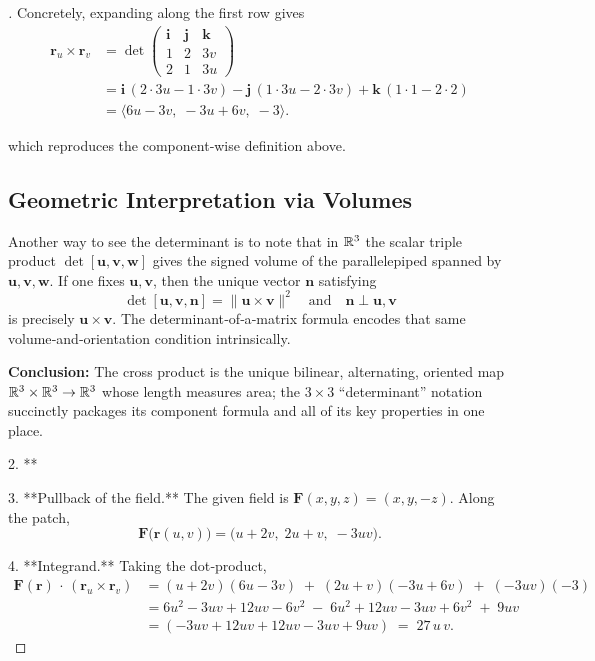 \documentclass[11pt,openany]{article}
\renewcommand{\emph}[1]{\textbf{#1}}
\begin{document}
\begin{proof}[\sol]
Concretely, expanding along the first row gives
\begin{align*}
	\mathbf r_u \times \mathbf r_v
	&=
	\det
	\begin{pmatrix}
		\mathbf i & \mathbf j & \mathbf k\\
		1         & 2         & 3v\\
		2         & 1         & 3u
	\end{pmatrix}\\
	&=
	\mathbf i\,(2\cdot3u - 1\cdot3v)
	-
	\mathbf j\,(1\cdot3u - 2\cdot3v)
	+
	\mathbf k\,(1\cdot1   - 2\cdot2)\\
	&=
	\bigl\langle 6u - 3v,\;-3u + 6v,\;-3\bigr\rangle.
\end{align*}

which reproduces the component‐wise definition above.

\subsection*{Geometric Interpretation via Volumes}

Another way to see the determinant is to note that in \(\mathbb{R}^3\) the scalar triple product
\(\det[\mathbf u,\mathbf v,\mathbf w]\)
gives the signed volume of the parallelepiped spanned by \(\mathbf u,\mathbf v,\mathbf w\).  If one fixes \(\mathbf u,\mathbf v\), then the unique vector \(\mathbf n\) satisfying
\[
\det[\mathbf u,\mathbf v,\mathbf n] = \|\mathbf u\times\mathbf v\|^2
\quad\text{and}\quad
\mathbf n\perp \mathbf u,\mathbf v
\]
is precisely \(\mathbf u\times\mathbf v\).  The determinant‐of‐a‐matrix formula encodes that same volume‐and‐orientation condition intrinsically.

\bigskip

\noindent\emph{Conclusion:}  The cross product is the unique bilinear, alternating, oriented map \(\mathbb{R}^3\times\mathbb{R}^3\to\mathbb{R}^3\) whose length measures area; the \(3\times3\) “determinant” notation succinctly packages its component formula and all of its key properties in one place.









2. **

3. **Pullback of the field.**  
The given field is \(\mathbf F(x,y,z)=(x,y,-z)\).  Along the patch,
\[
\mathbf F\bigl(\mathbf r(u,v)\bigr)
=\bigl(u+2v,\;2u+v,\;-3uv\bigr).
\]

4. **Integrand.**  
Taking the dot‐product,
\begin{align*}
	\mathbf F(\mathbf r)\,\cdot\,(\mathbf r_u\times\mathbf r_v)
	&= (u+2v)(6u-3v)\;+\;(2u+v)(-3u+6v)\;+\;(-3uv)(-3)\\
	&= 6u^2 -3uv +12uv -6v^2 \;-\;6u^2 +12uv -3uv +6v^2 \;+\;9uv\\
	&=(-3uv+12uv+12uv-3uv+9uv)\;=\;27\,u\,v.
\end{align*}


\end{proof}
\end{document}
